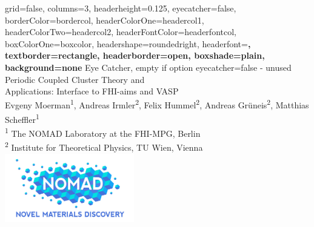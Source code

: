 


	

\color{standardfontcolor}

\begin{poster}{
		grid=false,
		columns=3,
		headerheight=0.125\textheight,
		eyecatcher=false, 
		borderColor=bordercol,
		headerColorOne=headercol1,
		headerColorTwo=headercol2,
		headerFontColor=headerfontcol,
		boxColorOne=boxcolor,
		headershape=roundedright,
		headerfont=\sffamily\bfseries\Large,
		textborder=rectangle,
		headerborder=open,
		boxshade=plain,
		background=none
	}
	{
		Eye Catcher, empty if option eyecatcher=false - unused
	}
%
{
	\textsf %
	{Periodic Coupled Cluster Theory and \\Applications: Interface to FHI-aims and VASP}
}
{\sf\vspace{0.5em}\\
	Evgeny Moerman\textsuperscript{1}, Andreas Irmler\textsuperscript{2}, Felix Hummel\textsuperscript{2}, 
	Andreas Grüneis\textsuperscript{2}, Matthias Scheffler\textsuperscript{1}
	\vspace{0.1em}\\
	\small{\textsuperscript{1} The NOMAD Laboratory at the FHI-MPG, Berlin
	\vspace{0.2em}\\
	\textsuperscript{2} Institute for Theoretical Physics, TU Wien, Vienna}
}
{\includegraphics[height=3cm]{bilder/logo/NOMAD_Logo_srgb_print_wlow.jpg}} 
%
%
\end{poster}
